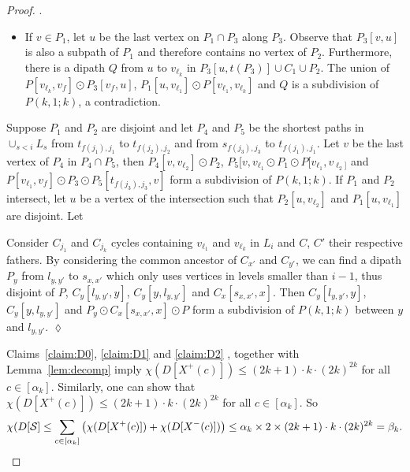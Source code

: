 \documentclass[utf8,10pt]{article}
\theoremstyle{plain}
\theoremstyle{definition}
\theoremstyle{remark}
\newenvironment{subproof}{\par\noindent {\it Subproof}.\ }{\hfill$\lozenge$\par\vspace{11pt}}
\newcommand{\dr}{ (2k+1)\cdot k \cdot (2k)^{2k}}
\begin{document}
\begin{proof}
\begin{subproof}
\begin{itemize}
\begin{itemize}
	\item If $v\in P_1$, let $u$ be the last vertex on $P_1\cap P_3$ along $P_3$.  Observe that $P_3[v,u]$ is also a subpath of $P_1$ and therefore contains no vertex of $P_2$. Furthermore, there is a dipath $Q$ from $u$ to $v_{\ell_k}$ in $P_3[u, t(P_3)]\cup C_1\cup  P_2$.
	The union of $P[v_{\ell_k}, v_f] \odot P_3[v_f,u]$, $P_1[u, v_{\ell_1}]\odot P[v_{\ell_1}, v_{\ell_k}]$ and $Q$ is a subdivision of $P(k,1;k)$, a contradiction.

	\end{itemize}

\end{itemize}

Suppose $P_1$ and $P_2$ are disjoint and let $P_4$ and $P_5$ be the shortest paths in $\cup_{s < i} L_s$ 
from $t_{f(j_1),j_1}$ to $t_{f(j_2),j_2}$
and from $s_{f(j_3),j_3}$ to $t_{f(j_1),j_1}$. Let $v$ be the last vertex of $P_4$ in $P_4 \cap P_5$, then $P_4[v,v_{\ell_2}] \odot P_2$,
$P_5[v, v_{\ell_1} \odot P_1 \odot P[v_{\ell_1}, v_{\ell_2]}$ and $P[v_{\ell_1}, v_f] \odot P_3 \odot P_5[t_{f(j_3),j_3}, v]$
form a subdivision of $P(k,1;k)$.
If $P_1$ and $P_2$ intersect, let $u$ be a vertex of the intersection such that $P_2[u, v_{\ell_2}]$ and $P_1[u, v_{\ell_1}]$ are disjoint.
Let%



Consider $C_{j_1}$ and $C_{j_k}$ cycles containing $v_{\ell_1}$ and $v_{\ell_k}$ in $L_i$ and $C$, $C'$ their respective fathers. 
By considering the common ancestor of $C_{x'}$ and $C_{y'}$, we can find a dipath $P_y$ from $l_{y,y'}$ to $s_{x,x'}$ which 
only uses vertices in levels smaller than $i-1$, thus disjoint of $P$, $C_y[l_{y,y'}, y]$, $C_y[y, l_{y,y'}]$ and $C_x[s_{x,x'}, x]$. 
Then $C_y[l_{y,y'}, y]$, $C_y[y, l_{y,y'}]$ and $P_y \odot C_x[s_{x,x'}, x] \odot P$ form a subdivision of $P(k,1;k)$ between $y$ 
and $l_{y,y'}$. 
\end{subproof}




Claims~\ref{claim:D0}, \ref{claim:D1} and  \ref{claim:D2} , together with Lemma~\ref{lem:decomp} imply $\chi(D[X^+(c)]) \leq  \dr$ for all $c\in [\alpha_k]$.
Similarly, one can show that  $\chi(D[X^+(c)]) \leq  \dr$ for all $c\in [\alpha_k]$. So $$\chi(D[{\cal S}]\leq \sum_{c\in [\alpha_k]} \left (\chi(D[X^+(c)]) + \chi(D[X^-(c)]) \right) \leq \alpha_k \times 2 \times \dr =\beta_k.$$
\end{proof}
\end{document}
